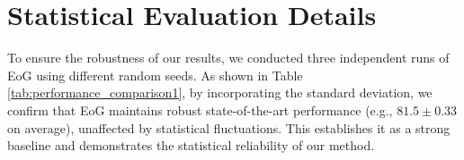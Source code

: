 





\section{Statistical Evaluation Details}


To ensure the robustness of our results, we conducted three independent runs of EoG using different random seeds. As shown in Table \ref{tab:performance_comparison1}, by incorporating the standard deviation, we confirm that EoG maintains robust state-of-the-art performance (e.g., $81.5 \pm 0.33$ on average), unaffected by statistical fluctuations. This establishes it as a strong baseline and demonstrates the statistical reliability of our method.

